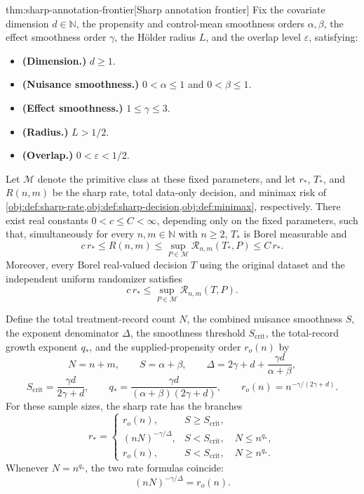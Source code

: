 \begin{theoremv}{thm:sharp-annotation-frontier}[Sharp annotation frontier]
Fix the covariate dimension \(d\in\mathbb N\), the propensity and control-mean smoothness orders \(\alpha,\beta\), the effect smoothness order \(\gamma\), the Hölder radius \(L\), and the overlap level \(\varepsilon\), satisfying:
\begin{itemize}
\item \textbf{(Dimension.)} \(d\ge1\).
\item \textbf{(Nuisance smoothness.)} \(0<\alpha\le1\) and \(0<\beta\le1\).
\item \textbf{(Effect smoothness.)} \(1\le\gamma\le3\).
\item \textbf{(Radius.)} \(L>1/2\).
\item \textbf{(Overlap.)} \(0<\varepsilon<1/2\).
\end{itemize}
Let \(\mathcal M\) denote the primitive class at these fixed parameters, and let \(r_*\), \(T_*\), and \(R(n,m)\) be the sharp rate, total data-only decision, and minimax risk of \cref{obj:def:sharp-rate,obj:def:sharp-decision,obj:def:minimax}, respectively. There exist real constants \(0<c\le C<\infty\), depending only on the fixed parameters, such that, simultaneously for every \(n,m\in\mathbb N\) with \(n\ge2\), \(T_*\) is Borel measurable and
\[
c\,r_*
\le R(n,m)
\le \sup_{P\in\mathcal M}\mathcal R_{n,m}(T_*,P)
\le C\,r_*.
\]
Moreover, every Borel real-valued decision \(T\) using the original dataset and the independent uniform randomizer satisfies
\[
c\,r_*\le \sup_{P\in\mathcal M}\mathcal R_{n,m}(T,P).
\]

Define the total treatment-record count \(N\), the combined nuisance smoothness \(S\), the exponent denominator \(\Delta\), the smoothness threshold \(S_{\mathrm{crit}}\), the total-record growth exponent \(q_*\), and the supplied-propensity order \(r_o(n)\) by
\[
N=n+m,\qquad S=\alpha+\beta,\qquad
\Delta=2\gamma+d+\frac{\gamma d}{\alpha+\beta},
\]
\[
S_{\mathrm{crit}}=\frac{\gamma d}{2\gamma+d},
\qquad
q_*=\frac{\gamma d}{(\alpha+\beta)(2\gamma+d)},
\qquad
r_o(n)=n^{-\gamma/(2\gamma+d)}.
\]
For these sample sizes, the sharp rate has the branches
\[
r_*=
\begin{cases}
r_o(n), & S\ge S_{\mathrm{crit}},\\
(nN)^{-\gamma/\Delta}, & S<S_{\mathrm{crit}},\quad N\le n^{q_*},\\
r_o(n), & S<S_{\mathrm{crit}},\quad N\ge n^{q_*}.
\end{cases}
\]
Whenever \(N=n^{q_*}\), the two rate formulas coincide:
\[
(nN)^{-\gamma/\Delta}=r_o(n).
\]
\end{theoremv}

